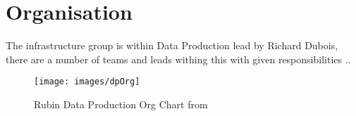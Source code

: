 \section{Organisation} \label{sec:org}

The infrastructure group is within Data Production lead by Richard Dubois, there are a number of teams and leads withing this
with given responsibilities ..



\begin{figure}
\begin{centering}
\texttt{[image: images/dpOrg]}
	\caption{Rubin Data Production Org Chart from \cite{RTN-001}\label{fig:dporg}}
\end{centering}
\end{figure}
